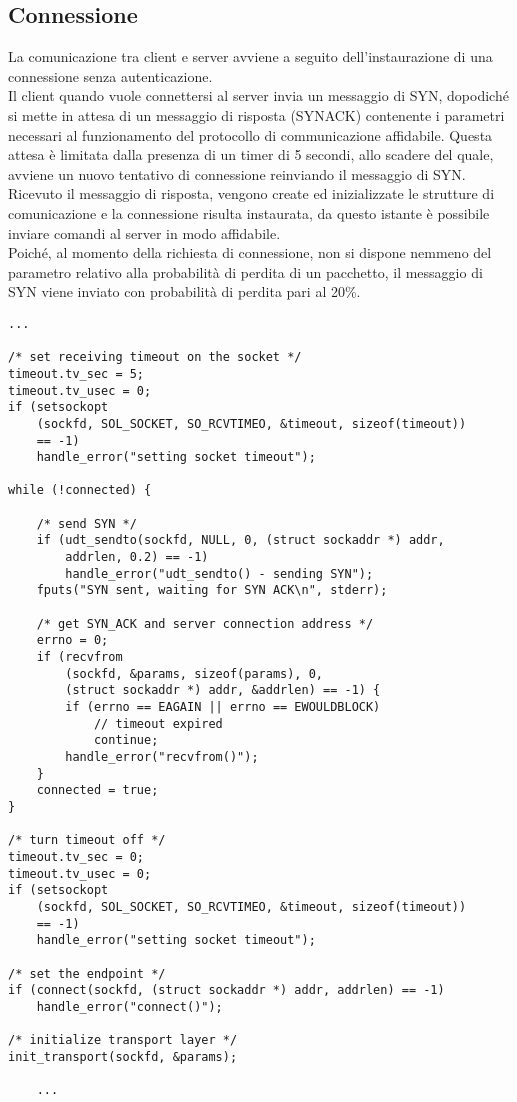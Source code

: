 \subsection{Connessione}
La comunicazione tra client e server avviene a seguito dell'instaurazione di 
una connessione senza autenticazione.\\
Il client quando vuole connettersi al server invia un messaggio di SYN, 
dopodiché si mette in attesa di un messaggio di risposta (SYNACK) contenente 
i parametri necessari al funzionamento del protocollo di communicazione 
affidabile. Questa attesa è limitata dalla presenza di un timer di 5 secondi,
allo scadere del quale, avviene un nuovo tentativo di connessione reinviando 
il messaggio di SYN.\\
Ricevuto il messaggio di risposta, vengono create ed inizializzate le 
strutture di comunicazione e la connessione risulta instaurata, da questo 
istante è possibile inviare comandi al server in modo affidabile.\\
Poiché, al momento della richiesta di connessione, non si dispone nemmeno del 
parametro relativo alla probabilità di perdita di un pacchetto, il messaggio 
di SYN viene inviato con probabilità di perdita pari al 20\%.
\begin{lstlisting}[title=client.c]
	...

/* set receiving timeout on the socket */
timeout.tv_sec = 5;
timeout.tv_usec = 0;
if (setsockopt
	(sockfd, SOL_SOCKET, SO_RCVTIMEO, &timeout, sizeof(timeout))
	== -1)
	handle_error("setting socket timeout");

while (!connected) {

	/* send SYN */
	if (udt_sendto(sockfd, NULL, 0, (struct sockaddr *) addr, 
		addrlen, 0.2) == -1)
		handle_error("udt_sendto() - sending SYN");
	fputs("SYN sent, waiting for SYN ACK\n", stderr);

	/* get SYN_ACK and server connection address */
	errno = 0;
	if (recvfrom
		(sockfd, &params, sizeof(params), 0,
		(struct sockaddr *) addr, &addrlen) == -1) {
		if (errno == EAGAIN || errno == EWOULDBLOCK)
			// timeout expired
			continue;
		handle_error("recvfrom()");
	}
	connected = true;
}

/* turn timeout off */
timeout.tv_sec = 0;
timeout.tv_usec = 0;
if (setsockopt
	(sockfd, SOL_SOCKET, SO_RCVTIMEO, &timeout, sizeof(timeout)) 
	== -1)
	handle_error("setting socket timeout");

/* set the endpoint */
if (connect(sockfd, (struct sockaddr *) addr, addrlen) == -1)
	handle_error("connect()");

/* initialize transport layer */
init_transport(sockfd, &params);

	...
\end{lstlisting}
